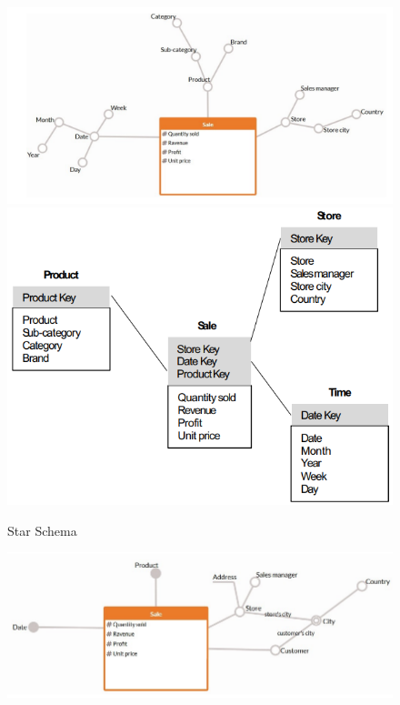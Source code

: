 \begin{figure}[ht!]
    \centering
    \includegraphics[scale=1.1]{images/DFM_star_schema_1.png}
    \includegraphics[scale=0.7]{images/DFM_star_schema_2.png}
    \caption{Star Schema}
    \label{figStarSchema}
\end{figure}

\begin{figure}[ht!]
    \centering
    \includegraphics[scale=0.7]{images/DFM_snowflake_schema_1.png}
\end{figure}
\newpage

